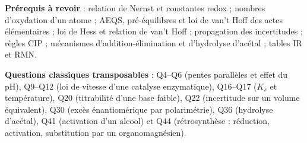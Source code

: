 \documentclass[11pt,a4paper]{article}
\begin{document}
\textbf{Prérequis à revoir} : relation de Nernst et constantes redox ; nombres d'oxydation d'un atome ; AEQS, pré-équilibres et loi de van't Hoff des actes élémentaires ; loi de Hess et relation de van't Hoff ; propagation des incertitudes ; règles CIP ; mécanismes d'addition-élimination et d'hydrolyse d'acétal ; tables IR et RMN.

\textbf{Questions classiques transposables} : Q4--Q6 (pentes parallèles et effet du pH), Q9--Q12 (loi de vitesse d'une catalyse enzymatique), Q16--Q17 (\(K_s\) et température), Q20 (titrabilité d'une base faible), Q22 (incertitude sur un volume équivalent), Q30 (excès énantiomérique par polarimétrie), Q36 (hydrolyse d'acétal), Q41 (activation d'un alcool) et Q44 (rétrosynthèse : réduction, activation, substitution par un organomagnésien).
\end{document}

